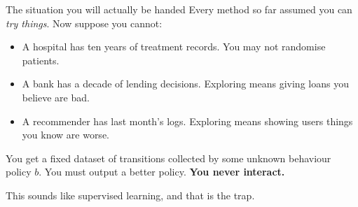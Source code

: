 \documentclass[aspectratio=169]{beamer}
\begin{document}
\begin{frame}{The situation you will actually be handed}
  \small
  Every method so far assumed you can \emph{try things}. Now suppose you cannot:

  \vskip 6pt
  \begin{itemize}\itemsep2pt
    \item A hospital has ten years of treatment records. You may not randomise patients.
    \item A bank has a decade of lending decisions. Exploring means giving loans you believe
          are bad.
    \item A recommender has last month's logs. Exploring means showing users things you know
          are worse.
  \end{itemize}

  \vskip 8pt
  \begin{center}
  \begin{tcolorbox}[colback=armblue!8, colframe=armblue, boxrule=0.7pt, arc=2pt, width=0.86\textwidth,
                    title={\textbf{Offline (batch) RL}}]
    \small
    You get a fixed dataset of transitions collected by some unknown behaviour policy $b$. You
    must output a better policy. \textbf{You never interact.}
  \end{tcolorbox}
  \end{center}

  \vskip 6pt
  \begin{center}
    \small
    This sounds like supervised learning, and that is the trap.
  \end{center}
\end{frame}
\end{document}
